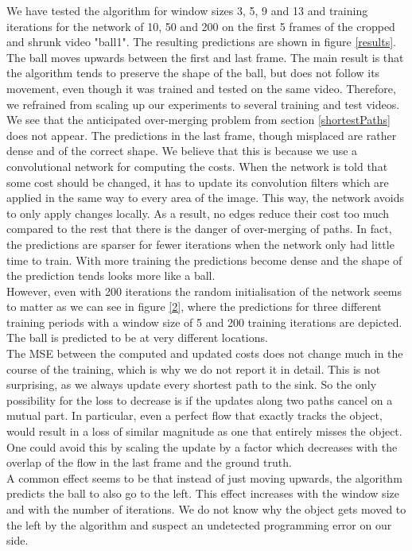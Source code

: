 \documentclass{article}
\begin{document}
{We have tested the algorithm for window sizes 3, 5, 9 and 13 and training iterations for the network of 10, 50 and 200 on the first 5 frames of the cropped and shrunk video "ball1". The resulting predictions are shown in figure \ref{results}. The ball moves upwards between the first and last frame. The main result is that the algorithm tends to preserve the shape of the ball, but does not follow its movement, even though it was trained and tested on the same video. Therefore, we refrained from scaling up our experiments to several training and test videos.\\
We see that the anticipated over-merging problem from section \ref{shortestPaths} does not appear. The predictions in the last frame, though misplaced are rather dense and of the correct shape. We believe that this is because we use a convolutional network for computing the costs. When the network is told that some cost should be changed, it has to update its convolution filters which are applied in the same way to every area of the image. This way, the network avoids to only apply changes locally. As a result, no edges reduce their cost too much compared to the rest that there is the danger of over-merging of paths. In fact, the predictions are sparser for fewer iterations when the network only had little time to train. With more training the predictions become dense and the shape of the prediction tends looks more like a ball. \\
However, even with 200 iterations the random initialisation of the network seems to matter as we can see in figure \ref{2}, where the predictions for three different training periods with a window size of 5 and 200 training iterations are depicted. The ball is predicted to be at very different locations.\\
The MSE between the computed and updated costs does not change much in the course of the training, which is why we do not report it in detail. This is not surprising, as we always update every shortest path to the sink. So the only possibility for the loss to decrease is if the updates along two paths cancel on a mutual part. In particular, even a perfect flow that exactly tracks the object, would result in a loss of similar magnitude as one that entirely misses the object. One could avoid this by scaling the update by a factor which decreases with the overlap of the flow in the last frame and the ground truth.\\
A common effect seems to be that instead of just moving upwards, the algorithm predicts the ball to also go to the left. This effect increases with the window size and with the number of iterations. We do not know why the object gets moved to the left by the algorithm and suspect an undetected programming error on our side.\\
}
\end{document}
